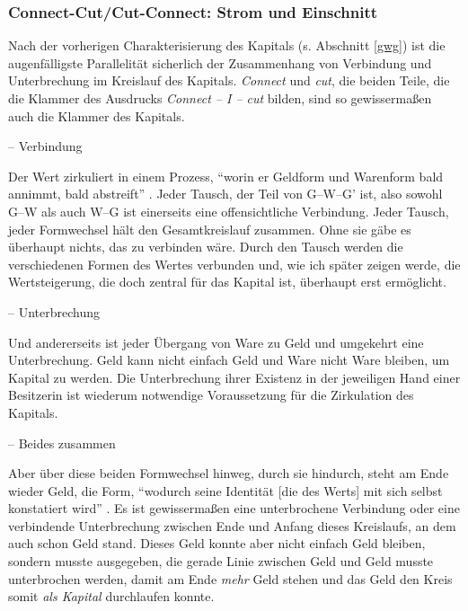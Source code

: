 \documentclass[12pt,
               DIV13,
               paper=a4,
               twoside=false,
               onehalfspacing,
               bibliography=totoc,
               toc=graduated,
               draft,
               ]{scrartcl}
\newcommand{\pc}[2]{\parencite[#1]{#2}}
\newcommand{\worries}[1]{\ifdraft{\textcolor{blue}{\texttt{(#1)}}}{}}
\newcommand{\gwg}{G--W--G'\xspace}
\newcommand{\cic}{Connect -- I -- cut\xspace}
\begin{document}


\subsubsection{Connect-Cut/Cut-Connect: Strom und Einschnitt}


Nach der vorherigen Charakterisierung des Kapitals (s. Abschnitt \ref{gwg}) ist
die augenfälligste Parallelität sicherlich der Zusammenhang von
Verbindung und Unterbrechung im Kreislauf des Kapitals. \emph{Connect}
und \emph{cut}, die beiden Teile, die die Klammer des Ausdrucks \emph{\cic}
bilden, sind so gewissermaßen auch die Klammer des Kapitals.

-- Verbindung

Der Wert zirkuliert in einem Prozess, "`worin er Geldform und
Warenform bald annimmt, bald abstreift"' \pc{169}{kap}. Jeder Tausch,
der Teil von \gwg ist, also sowohl G--W als auch W--G ist einerseits
eine offensichtliche Verbindung. Jeder Tausch, jeder Formwechsel hält
den Gesamtkreislauf zusammen. Ohne sie gäbe es überhaupt nichts, das
zu verbinden wäre. Durch den Tausch werden die verschiedenen Formen
des Wertes verbunden und, wie ich später zeigen werde, die
Wertsteigerung, die doch zentral für das Kapital ist, überhaupt erst
ermöglicht.

-- Unterbrechung

Und andererseits ist jeder Übergang von Ware zu Geld und umgekehrt
eine Unterbrechung. Geld kann nicht einfach Geld und Ware nicht Ware
bleiben, um Kapital zu werden. Die Unterbrechung ihrer Existenz in der
jeweiligen Hand einer Besitzerin ist wiederum notwendige
Voraussetzung für die Zirkulation des Kapitals.

-- Beides zusammen

Aber über diese beiden Formwechsel hinweg, durch sie hindurch, steht
am Ende wieder Geld, die Form, "`wodurch seine Identität [die des
Werts] mit sich selbst konstatiert wird"' \pc{169}{kap}. Es ist
gewissermaßen eine unterbrochene Verbindung oder eine verbindende
Unterbrechung zwischen Ende und Anfang dieses Kreislaufs, an dem auch
schon Geld stand. Dieses Geld konnte aber nicht einfach Geld bleiben,
sondern musste ausgegeben, die gerade Linie zwischen Geld und Geld
musste unterbrochen werden, damit am Ende \emph{mehr} Geld stehen und
das Geld den Kreis somit \emph{als Kapital} durchlaufen konnte.
\end{document}
